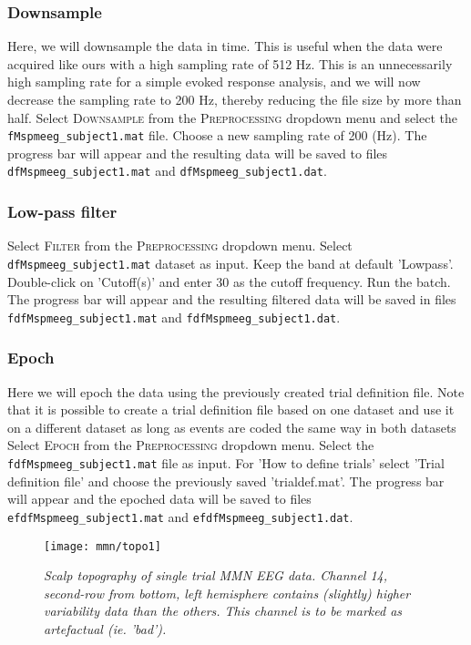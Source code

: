 \subsubsection{Downsample}
Here, we will downsample the data in time. This is useful when the data were acquired like ours with a high sampling rate of 512 Hz. This is an unnecessarily high sampling rate for a simple evoked response analysis, and we will now decrease the sampling rate to 200 Hz, thereby reducing the file size by more than half.  Select \textsc{Downsample} from the  \textsc{Preprocessing} dropdown menu and select the \texttt{fMspmeeg\_subject1.mat} file. Choose a new sampling rate of 200 (Hz). The progress bar will appear and the resulting data will be saved to files \texttt{dfMspmeeg\_subject1.mat} and \texttt{dfMspmeeg\_subject1.dat}.

\subsubsection{Low-pass filter}
 Select \textsc{Filter} from the \textsc{Preprocessing} dropdown menu. Select \texttt{dfMspmeeg\_subject1.mat} dataset as input.  Keep the band at default  'Lowpass'. Double-click on 'Cutoff(s)' and enter 30 as the cutoff frequency. Run the batch. The progress bar will appear and the resulting filtered data will be saved in files \texttt{fdfMspmeeg\_subject1.mat} and \texttt{fdfMspmeeg\_subject1.dat}.

\subsubsection{Epoch}
Here we will epoch the data using the previously created trial definition file. Note that it is possible to create a trial definition file based on one dataset and use it on a different dataset as long as events are coded the same way in both datasets  Select \textsc{Epoch} from the \textsc{Preprocessing} dropdown menu. Select the \texttt{fdfMspmeeg\_subject1.mat} file as input. For 'How to define trials' select 'Trial definition file' and choose the previously saved 'trialdef.mat'. The progress bar will appear and the epoched data will be saved to files \texttt{efdfMspmeeg\_subject1.mat} and \texttt{efdfMspmeeg\_subject1.dat}.

\begin{figure}
\begin{center}
\texttt{[image: mmn/topo1]}
\caption{\em Scalp topography of single trial MMN EEG data. Channel 14, second-row from bottom, left hemisphere contains (slightly) higher variability data than the others. This channel is to be marked as artefactual (ie. 'bad').
\label{topo1}}
\end{center}
\end{figure}

